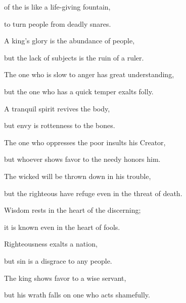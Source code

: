 {of the {}
is like a life-giving
fountain,
\par }{\Q to turn
people from deadly
snares.
\par }{\Q {}A king’s
glory
is the abundance
of people,
\par }{\Q but the lack
of subjects
is the ruin
of a ruler.
\par }{\Q {}The one who is slow
to anger
has great
understanding,
\par }{\Q but the one who has a quick
temper
exalts
folly.
\par }{\Q {}A tranquil
spirit revives
the body,
\par }{\Q but envy
is rottenness
to the bones.
\par }{\Q {}The one who oppresses
the poor
insults
his Creator,
\par }{\Q but whoever shows favor
to the needy
honors him.
\par }{\Q {}The wicked
will be thrown
down in his trouble,

\par }{\Q but
the righteous
have refuge
even in the threat
of death.
\par }{\Q {}Wisdom
rests
in the heart
of the discerning;
\par }{\Q it
is known
even in the heart
of fools.
\par }{\Q {}Righteousness
exalts
a nation,
\par }{\Q but sin
is a disgrace
to any people.
\par }{\Q {}The king
shows favor
to a wise
servant,
\par }{\Q but his wrath
falls on one who acts shamefully.

\par }
